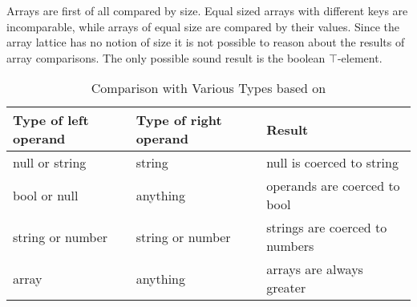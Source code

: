 Arrays are first of all compared by size. Equal sized arrays with different keys are incomparable, while arrays of equal size are compared by their values. Since the array lattice has no notion of size it is not possible to reason about the results of array comparisons. The only possible sound result is the boolean $\top$-element.

\begin{table}[htbp]
\centering
\begin{tabular}{l|l||l}
Type of left operand & Type of right operand & Result \\\hline\hline
null or string & string & null is coerced to string \\\hline
bool or null & anything & operands are coerced to bool \\\hline
string or number & string or number & strings are coerced to numbers \\\hline
array & anything & arrays are always greater
\end{tabular}
\caption{Comparison with Various Types based on \protect{}}
\label{tab:comparisons}
\end{table}

